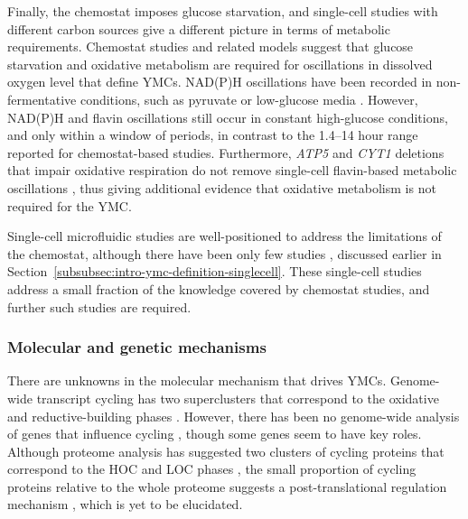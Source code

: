 Finally, the chemostat imposes glucose starvation, and single-cell studies with different carbon sources give a different picture in terms of metabolic requirements.
Chemostat studies and related models suggest that glucose starvation and oxidative metabolism are required for oscillations in dissolved oxygen level that define YMCs.
NAD(P)H oscillations have been recorded in non-fermentative conditions, such as pyruvate or low-glucose media \parencite{papagiannakisAutonomousMetabolicOscillations2017}.
However, NAD(P)H \parencite{papagiannakisAutonomousMetabolicOscillations2017,ozsezenInferenceHighLevelInteraction2019} and flavin \parencite{baumgartnerFlavinbasedMetabolicCycles2018} oscillations still occur in constant high-glucose conditions, and only within a window of periods, in contrast to the 1.4--14 hour range reported for chemostat-based studies.
Furthermore, \textit{ATP5} and \textit{CYT1} deletions that impair oxidative respiration do not remove single-cell flavin-based metabolic oscillations \parencite{baumgartnerFlavinbasedMetabolicCycles2018}, thus giving additional evidence that oxidative metabolism is not required for the YMC\@.

Single-cell microfluidic studies are well-positioned to address the limitations of the chemostat,
although there have been only few studies \parencite{laxmanBehaviorMetabolicCycling2010,papagiannakisAutonomousMetabolicOscillations2017,baumgartnerFlavinbasedMetabolicCycles2018,ozsezenInferenceHighLevelInteraction2019}, discussed earlier in Section~\ref{subsubsec:intro-ymc-definition-singlecell}.
These single-cell studies address a small fraction of the knowledge covered by chemostat studies, and further such studies are required.


\subsubsection{Molecular and genetic mechanisms}
\label{subsubsec:intro-ymc-unresolved-molecular}

There are unknowns in the molecular mechanism that drives YMCs.
Genome-wide transcript cycling has two superclusters that correspond to the oxidative and reductive-building phases \parencite{machneYinYangYeast2012}.
However, there has been no genome-wide analysis of genes that influence cycling \parencite{mellorMolecularBasisMetabolic2016}, though some genes seem to have key roles.
Although proteome analysis has suggested two clusters of cycling proteins that correspond to the HOC and LOC phases \parencite{oneillEukaryoticCellBiology2020}, the small proportion of cycling proteins relative to the whole proteome suggests a post-translational regulation mechanism \parencite{zylstraMetabolicDynamicsCell2022}, which is yet to be elucidated.

